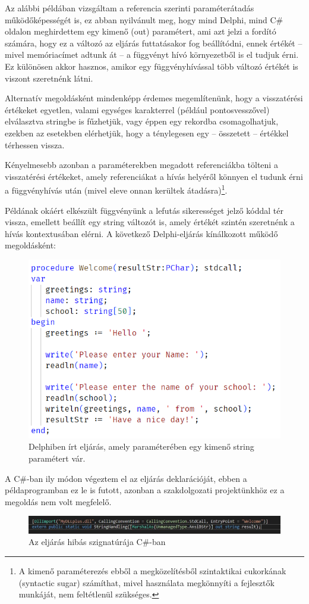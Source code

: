 \documentclass[tocnopagenum]{thesis-ekf}
\theoremstyle{definition}
\theoremstyle{remark}
\begin{document}
	Az alábbi példában vizsgáltam a referencia szerinti paraméterátadás működőképességét is, ez abban nyilvánult meg, hogy mind Delphi, mind C\# oldalon meghirdettem egy kimenő (out) paramétert, ami azt jelzi a fordító számára, hogy ez a változó az eljárás futtatásakor fog beállítódni, ennek értékét -- mivel memóriacímet adtunk át -- a függvényt hívó környezetből is el tudjuk érni. Ez különösen akkor hasznos, amikor egy függvényhívással több változó értékét is viszont szeretnénk látni.
	
	Alternatív megoldásként mindenképp érdemes megemlítenünk, hogy a visszatérési értékeket egyetlen, valami egységes karakterrel (például pontosvesszővel) elválasztva stringbe is fűzhetjük, vagy éppen egy rekordba csomagolhatjuk, ezekben az esetekben elérhetjük, hogy a ténylegesen egy -- összetett -- értékkel térhessen vissza.
	
	Kényelmesebb azonban a paraméterekben megadott referenciákba tölteni a visszatérési értékeket, amely referenciákat a hívás helyéről könnyen el tudunk érni a függvényhívás után (mivel eleve onnan kerültek átadásra)\footnote{A kimenő paraméterezés ebből a megközelítésből szintaktikai cukorkának (syntactic sugar) számíthat, mivel használata megkönnyíti a fejlesztők munkáját, nem feltétlenül szükséges.}.
	
	Példának okáért elkészült függvényünk a lefutás sikerességet jelző kóddal tér vissza, emellett beállít egy string változót is, amely értékét szintén szeretnénk a hívás kontextusában elérni. A következő Delphi-eljárás kínálkozott működő megoldásként:
	\begin{figure}[h!]
		\centering
		\includegraphics[scale=0.9]{hibas_string_delphi}
		\caption{Delphiben írt eljárás, amely paraméterében egy kimenő string paramétert vár.}
		\label{hibas_string_delphi}
	\end{figure}
	A C\#-ban ily módon végeztem el az eljárás deklarációját, ebben a példaprogramban ez le is futott, azonban a szakdolgozati projektünkhöz ez a megoldás nem volt megfelelő.
	\begin{figure}[h!]
		\centering
		\includegraphics[scale=0.75]{hibas_string_csharp}
		\caption{Az eljárás hibás szignatúrája C\#-ban}
		\label{hibas_string_csharp}
	\end{figure}
\end{document}
